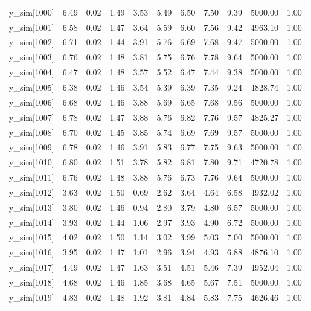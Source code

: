 \begin{table}[ht]
\begin{tabular}{rrrrrrrrrrr}
  y\_sim[1000] & 6.49 & 0.02 & 1.49 & 3.53 & 5.49 & 6.50 & 7.50 & 9.39 & 5000.00 & 1.00 \\ 
  y\_sim[1001] & 6.58 & 0.02 & 1.47 & 3.64 & 5.59 & 6.60 & 7.56 & 9.42 & 4963.10 & 1.00 \\ 
  y\_sim[1002] & 6.71 & 0.02 & 1.44 & 3.91 & 5.76 & 6.69 & 7.68 & 9.47 & 5000.00 & 1.00 \\ 
  y\_sim[1003] & 6.76 & 0.02 & 1.48 & 3.81 & 5.75 & 6.76 & 7.78 & 9.64 & 5000.00 & 1.00 \\ 
  y\_sim[1004] & 6.47 & 0.02 & 1.48 & 3.57 & 5.52 & 6.47 & 7.44 & 9.38 & 5000.00 & 1.00 \\ 
  y\_sim[1005] & 6.38 & 0.02 & 1.46 & 3.54 & 5.39 & 6.39 & 7.35 & 9.24 & 4828.74 & 1.00 \\ 
  y\_sim[1006] & 6.68 & 0.02 & 1.46 & 3.88 & 5.69 & 6.65 & 7.68 & 9.56 & 5000.00 & 1.00 \\ 
  y\_sim[1007] & 6.78 & 0.02 & 1.47 & 3.88 & 5.76 & 6.82 & 7.76 & 9.57 & 4825.27 & 1.00 \\ 
  y\_sim[1008] & 6.70 & 0.02 & 1.45 & 3.85 & 5.74 & 6.69 & 7.69 & 9.57 & 5000.00 & 1.00 \\ 
  y\_sim[1009] & 6.78 & 0.02 & 1.46 & 3.91 & 5.83 & 6.77 & 7.75 & 9.63 & 5000.00 & 1.00 \\ 
  y\_sim[1010] & 6.80 & 0.02 & 1.51 & 3.78 & 5.82 & 6.81 & 7.80 & 9.71 & 4720.78 & 1.00 \\ 
  y\_sim[1011] & 6.76 & 0.02 & 1.48 & 3.88 & 5.76 & 6.73 & 7.76 & 9.64 & 5000.00 & 1.00 \\ 
  y\_sim[1012] & 3.63 & 0.02 & 1.50 & 0.69 & 2.62 & 3.64 & 4.64 & 6.58 & 4932.02 & 1.00 \\ 
  y\_sim[1013] & 3.80 & 0.02 & 1.46 & 0.94 & 2.80 & 3.79 & 4.80 & 6.57 & 5000.00 & 1.00 \\ 
  y\_sim[1014] & 3.93 & 0.02 & 1.44 & 1.06 & 2.97 & 3.93 & 4.90 & 6.72 & 5000.00 & 1.00 \\ 
  y\_sim[1015] & 4.02 & 0.02 & 1.50 & 1.14 & 3.02 & 3.99 & 5.03 & 7.00 & 5000.00 & 1.00 \\ 
  y\_sim[1016] & 3.95 & 0.02 & 1.47 & 1.01 & 2.96 & 3.94 & 4.93 & 6.88 & 4876.10 & 1.00 \\ 
  y\_sim[1017] & 4.49 & 0.02 & 1.47 & 1.63 & 3.51 & 4.51 & 5.46 & 7.39 & 4952.04 & 1.00 \\ 
  y\_sim[1018] & 4.68 & 0.02 & 1.46 & 1.85 & 3.68 & 4.65 & 5.67 & 7.51 & 5000.00 & 1.00 \\ 
  y\_sim[1019] & 4.83 & 0.02 & 1.48 & 1.92 & 3.81 & 4.84 & 5.83 & 7.75 & 4626.46 & 1.00 \\ 

\end{tabular}
\end{table}
